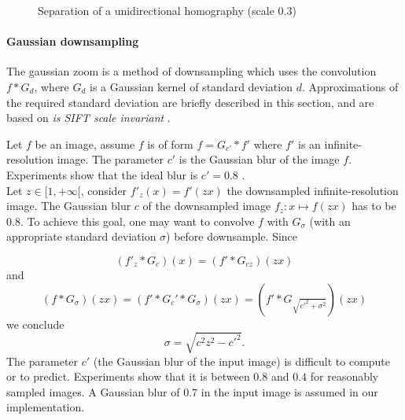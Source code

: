 \begin{figure}[h!]
\caption{Separation of a unidirectional homography (scale $0.3$) }
\label{image_separation_f14}
\end{figure}

\paragraph{Gaussian downsampling}
\label{zoom_gaussien}
The gaussian zoom is a method of downsampling which uses the convolution $f*G_{d}$, where $G_d$ is a Gaussian kernel of standard deviation $d$. Approximations of the required standard deviation are briefly described in this section, and are based on \emph{is SIFT scale invariant} \cite{morel2011sift}.


Let $f$ be an image, assume $f$ is of form $f=G_{c'} * f'$ where $f'$ is an infinite-resolution image. The parameter $c'$ is the Gaussian blur of the image $f$. Experiments show that the ideal blur is $c'=0.8$ \cite{morel2011sift}.\\
Let $z \in [1,+\infty[$, consider $f'_z(x)=f'(zx)$ the downsampled infinite-resolution image.
The Gaussian blur $c$ of the downsampled image $f_z : x \mapsto f(zx)$ has to be $0.8$. To achieve this goal, one may want to convolve $f$ with $G_\sigma$ (with an appropriate standard deviation $\sigma$) before downsample. Since

\begin{equation*}
(f'_z*G_{c})(x)=(f'*G_{cz})(zx)
\end{equation*}
and 
\begin{equation*}
(f*G_\sigma)(zx)=(f'*G_c'*G_\sigma)(zx)=(f'*G_{\sqrt{c'^2 + \sigma^2}})(zx)
\end{equation*}
we conclude
\begin{equation}
\sigma=\sqrt{c^2 z^2 - c'^2}.
\label{formule_zoom_gaussien}
\end{equation}
The parameter $c'$ (the Gaussian blur of the input image) is difficult to compute or to predict. Experiments show that it is between $0.8$ and $0.4$ for reasonably sampled images. A Gaussian blur of $0.7$ in the input image is assumed in our implementation.

